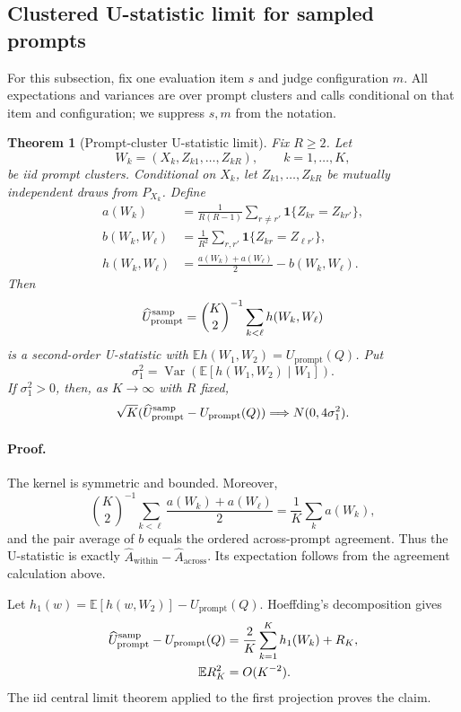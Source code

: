 \documentclass[letterpaper]{article}
\newtheorem{theorem}{Theorem}
\newcommand{\E}{\mathbb E}
\newcommand{\Var}{\operatorname{Var}}
\newcommand{\1}{\mathbf 1}
\newcommand{\Up}{U_{\mathrm{prompt}}}
\newcommand{\Aw}{\widehat A_{\mathrm{within}}}
\newcommand{\Aa}{\widehat A_{\mathrm{across}}}
\begin{document}
\subsection{Clustered U-statistic limit for sampled prompts}
\label{sec:sampled-clt}

For this subsection, fix one evaluation item $s$ and judge configuration
$m$. All expectations and variances are over prompt clusters and calls
conditional on that item and configuration; we suppress $s,m$ from the
notation.

\begin{theorem}[Prompt-cluster U-statistic limit]
\label{thm:s-clt}
Fix $R\ge2$. Let
\[
W_k=(X_k,Z_{k1},\ldots,Z_{kR}),\qquad k=1,\ldots,K,
\]
be iid prompt clusters. Conditional on $X_k$, let
$Z_{k1},\ldots,Z_{kR}$ be mutually independent draws from $P_{X_k}$.
Define
\begin{align}
a(W_k)
&=\frac1{R(R-1)}\sum_{r\ne r'}
\1\{Z_{kr}=Z_{kr'}\},\\
b(W_k,W_\ell)
&=\frac1{R^2}\sum_{r,r'}
\1\{Z_{kr}=Z_{\ell r'}\},\\
h(W_k,W_\ell)
&=\frac{a(W_k)+a(W_\ell)}2-b(W_k,W_\ell).
\end{align}
Then
\begin{equation}
\widehat\Up^{\rm samp}
=\binom K2^{-1}\sum_{k<\ell}h(W_k,W_\ell)
\end{equation}
is a second-order U-statistic with
$\E h(W_1,W_2)=\Up(Q)$. Put
\[
\sigma_1^2
=\Var(\E[h(W_1,W_2)\mid W_1]).
\]
If $\sigma_1^2>0$, then, as $K\rightarrow\infty$ with $R$ fixed,
\begin{equation}
\sqrt K(\widehat\Up^{\rm samp}-\Up(Q))
\Longrightarrow N(0,4\sigma_1^2).
\end{equation}
\end{theorem}

\paragraph{Proof.}
The kernel is symmetric and bounded. Moreover,
\[
\binom K2^{-1}\sum_{k<\ell}
\frac{a(W_k)+a(W_\ell)}2
=\frac1K\sum_ka(W_k),
\]
and the pair average of $b$ equals the ordered across-prompt agreement.
Thus the U-statistic is exactly $\Aw-\Aa$. Its expectation follows from the
agreement calculation above.

Let
$h_1(w)=\E[h(w,W_2)]-\Up(Q)$. Hoeffding's decomposition
\citep{hoeffding1948class} gives
\[
\begin{aligned}
\widehat\Up^{\rm samp}-\Up(Q)
&=\frac2K\sum_{k=1}^Kh_1(W_k)+R_K,\\
\E R_K^2&=O(K^{-2}).
\end{aligned}
\]
The iid central limit theorem applied to the first projection proves the
claim.
\end{document}
